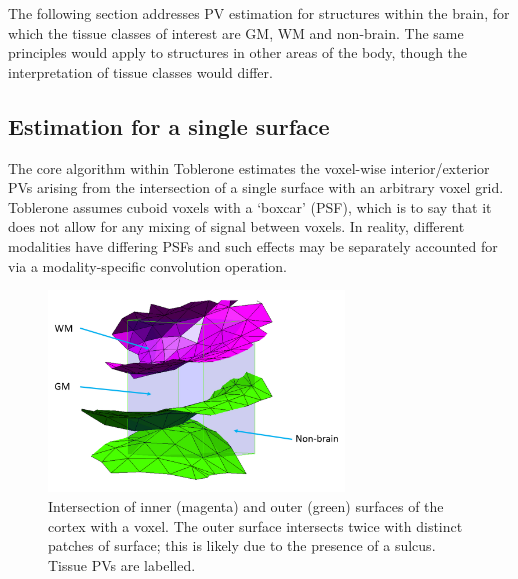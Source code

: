 \documentclass[12pt]{report}
\begin{document}
The following section addresses PV estimation for structures within the brain, for which the tissue classes of interest are GM, WM and non-brain. The same principles would apply to structures in other areas of the body, though the interpretation of tissue classes would differ. 

\subsection{Estimation for a single surface}

The core algorithm within Toblerone estimates the voxel-wise interior/exterior PVs arising from the intersection of a single surface with an arbitrary voxel grid. Toblerone assumes cuboid voxels with a ‘boxcar’ (PSF), which is to say that it does not allow for any mixing of signal between voxels. In reality, different modalities have differing PSFs and such effects may be separately accounted for via a modality-specific convolution operation. 

\begin{figure}
\centering
\includegraphics[width = 0.7\textwidth]{example_voxel.png}
\caption{Intersection of inner (magenta) and outer (green) surfaces of the cortex with a voxel. The outer surface intersects twice with distinct patches of surface; this is likely due to the presence of a sulcus. Tissue PVs are labelled.  }
\label{example_voxel}
\end{figure}
\end{document}

